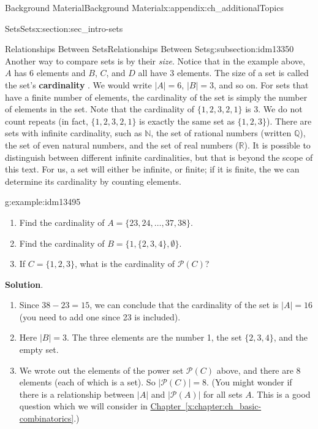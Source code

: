 \documentclass[oneside,10pt,]{book}
\newcommand{\terminology}[1]{\textbf{#1}}
\numberwithin{equation}{chapter}
\def\N{\mathbb N}
\def\pow{\mathcal P}
\newcommand{\card}[1]{\left| #1 \right|}
\begin{document}
\begin{appendixptx}{Background Material}{}{Background Material}{}{}{x:appendix:ch_additionalTopics}
\begin{sectionptx}{Sets}{}{Sets}{}{}{x:section:sec_intro-sets}
\begin{subsectionptx}{Relationships Between Sets}{}{Relationships Between Sets}{}{}{g:subsection:idm13350}
Another way to compare sets is by their \emph{size}. Notice that in the example above, \(A\) has 6 elements and \(B\), \(C\), and \(D\) all have 3 elements. The size of a set is called the set's \terminology{cardinality} . We would write \(|A| = 6\), \(|B| = 3\), and so on. For sets that have a finite number of elements, the cardinality of the set is simply the number of elements in the set. Note that the cardinality of \(\{ 1, 2, 3, 2, 1\}\) is 3. We do not count repeats (in fact, \(\{1, 2, 3, 2, 1\}\) is exactly the same set as \(\{1, 2, 3\}\)). There are sets with infinite cardinality, such as \(\N\), the set of rational numbers (written \(\mathbb Q\)), the set of even natural numbers, and the set of real numbers (\(\mathbb R\)). It is possible to distinguish between different infinite cardinalities, but that is beyond the scope of this text. For us, a set will either be infinite, or finite; if it is finite, the we can determine its cardinality by counting elements.%
\begin{example}{}{g:example:idm13495}%
%
\begin{enumerate}
\item{}Find the cardinality of \(A = \{23, 24, \ldots, 37, 38\}\).%
\item{}Find the cardinality of \(B = \{1, \{2, 3, 4\}, \emptyset\}\).%
\item{}If \(C = \{1,2,3\}\), what is the cardinality of \(\pow(C)\)?%
\end{enumerate}
%
\par\smallskip%
\noindent\textbf{Solution}.\hypertarget{g:solution:idm13509}{}\quad{}%
\begin{enumerate}
\item{}Since \(38 - 23 = 15\), we can conclude that the cardinality of the set is \(|A| = 16\) (you need to add one since 23 is included).%
\item{}Here \(|B| = 3\). The three elements are the number 1, the set \(\{2,3,4\}\), and the empty set.%
\item{}We wrote out the elements of the power set \(\pow(C)\) above, and there are 8 elements (each of which is a set). So \(\card{\pow(C)} = 8\).  (You might wonder if there is a relationship between \(\card{A}\) and \(\card{\pow(A)}\) for all sets \(A\).  This is a good question which we will consider in \hyperref[x:chapter:ch_basic-combinatorics]{Chapter~\ref{x:chapter:ch_basic-combinatorics}}.)%
\end{enumerate}
%
\end{example}
\end{subsectionptx}

\end{sectionptx}
\end{appendixptx}
\end{document}
